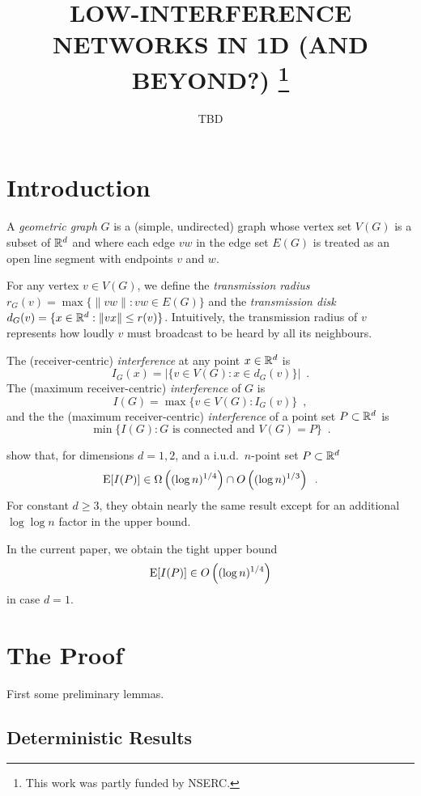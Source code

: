 \documentclass{patmorin}
\title{\MakeUppercase{Low-Interference Networks in 1D (and beyond?)}%
    \thanks{This work was partly funded by NSERC.}}
\author{TBD}
\begin{document}
\maketitle


\begin{abstract}
  
\end{abstract}

\section{Introduction}

A \emph{geometric graph} $G$ is a (simple, undirected) graph whose vertex set $V(G)$ is a subset of $\mathbb{R}^d$ and where each edge $vw$ in the edge set $E(G)$ is treated as an open line segment with endpoints $v$ and $w$. 

For any vertex $v\in V(G)$, we define the \emph{transmission radius} $r_G(v)=\max\{ \|vw\| : vw\in E(G) \}$ and the \emph{transmission disk} $d_G(v)=\{ x\in\mathbb{R}^d : \|vx\| \le r(v) \}$.  Intuitively, the transmission radius of $v$ represents how loudly $v$ must broadcast to be heard by all its neighbours.

The (receiver-centric) \emph{interference} at any point $x\in\mathbb{R}^d$ is
\[  
  I_G(x) = |\{v\in V(G): x\in d_G(v) \}| \enspace .
\]
The (maximum receiver-centric) \emph{interference} of $G$ is
\[
   I(G) = \max\{ v\in V(G): I_G(v) \} \enspace ,
\]
and the the (maximum receiver-centric) \emph{interference} of a point set $P\subset\mathbb{R}^d$ is
\[
  \min\{ I(G) : \mbox{$G$ is connected and $V(G)=P$} \}\enspace .
\]

\citet{devroye.morin:note} show that, for dimensions $d=1,2$, and a i.u.d.\ $n$-point set $P\subset\mathbb{R}^d$
\[
  \mathrm{E}[I(P)] \in \Omega\left((\log n)^{1/4}\right) \cap O\left((\log n)^{1/3}\right)  \enspace .
\]
For constant $d\ge 3$, they obtain nearly the same result except for an additional $\log\log n$ factor in the upper bound.

In the current paper, we obtain the tight upper bound
\[
  \mathrm{E}[I(P)] \in O\left((\log n)^{1/4}\right)
\]
in case $d=1$.


\section{The Proof}

First some preliminary lemmas. 


\subsection{Deterministic Results}
\end{document}
